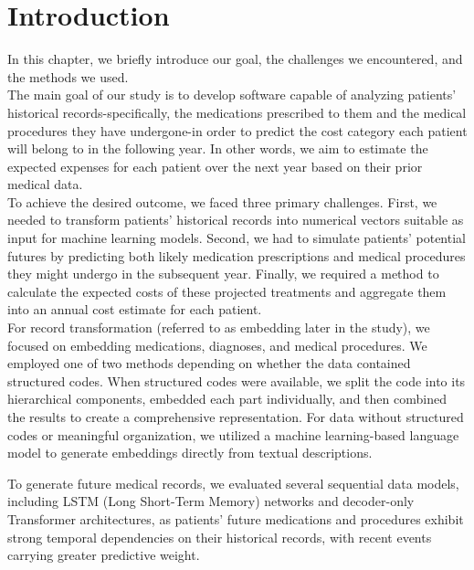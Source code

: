 
\chapter{Introduction}

In this chapter, we briefly introduce our goal, the challenges we encountered, and the methods we used.
\\

The main goal of our study is to develop software capable of analyzing patients’ historical records-specifically, the medications prescribed to them and the medical procedures they have undergone-in order to predict the cost category each patient will belong to in the following year. In other words, we aim to estimate the expected expenses for each patient over the next year based on their prior medical data. 
\\

To achieve the desired outcome, we faced three primary challenges. First, we needed to transform patients' historical records into numerical vectors suitable as input for machine learning models. Second, we had to simulate patients' potential futures by predicting both likely medication prescriptions and medical procedures they might undergo in the subsequent year. Finally, we required a method to calculate the expected costs of these projected treatments and aggregate them into an annual cost estimate for each patient.
\\

For record transformation (referred to as embedding later in the study), we focused on embedding medications, diagnoses, and medical procedures. We employed one of two methods depending on whether the data contained structured codes. When structured codes were available, we split the code into its hierarchical components, embedded each part individually, and then combined the results to create a comprehensive representation. For data without structured codes or meaningful organization, we utilized a machine learning-based language model to generate embeddings directly from textual descriptions.
\newpage

To generate future medical records, we evaluated several sequential data models, including LSTM (Long Short-Term Memory) networks and decoder-only Transformer architectures, as patients' future medications and procedures exhibit strong temporal dependencies on their historical records, with recent events carrying greater predictive weight.
\\

